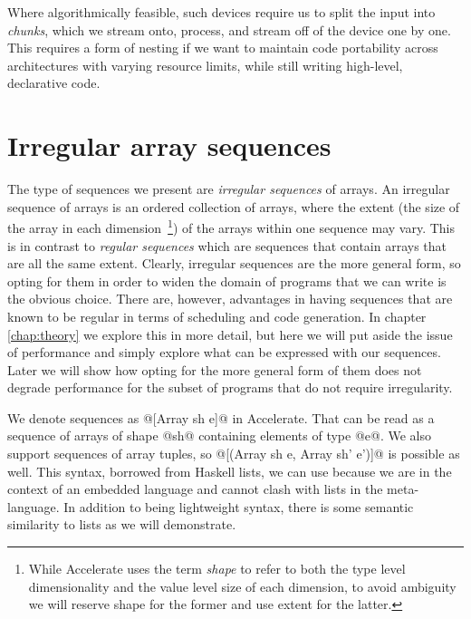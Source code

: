 Where algorithmically feasible, such devices require us to split the input into \emph{chunks}, which we stream onto, process, and stream off of the device one by one. This requires a form of nesting if we want to maintain code portability across architectures with varying resource limits, while still writing high-level, declarative code.

\section{Irregular array sequences}
\label{sec:sequences}

The type of sequences we present are \emph{irregular sequences} of arrays. An irregular sequence of arrays is an ordered collection of arrays, where the extent (the size of the array in each dimension~\footnote{While Accelerate uses the term \emph{shape} to refer to both the type level dimensionality and the value level size of each dimension, to avoid ambiguity we will reserve shape for the former and use extent for the latter.}) of the arrays within one sequence may vary. This is in contrast to \emph{regular sequences} which are sequences that contain arrays that are all the same extent. Clearly, irregular sequences are the more general form, so opting for them in order to widen the domain of programs that we can write is the obvious choice. There are, however, advantages in having sequences that are known to be regular in terms of scheduling and code generation. In chapter \ref{chap:theory} we explore this in more detail, but here we will put aside the issue of performance and simply explore what can be expressed with our sequences. Later we will show how opting for the more general form of them does not degrade performance for the subset of programs that do not require irregularity.

We denote sequences as @[Array sh e]@ in Accelerate. That can be read as a sequence of arrays of shape @sh@ containing elements of type @e@. We also support sequences of array tuples, so @[(Array sh e, Array sh' e')]@ is possible as well. This syntax, borrowed from Haskell lists, we can use because we are in the context of an embedded language and cannot clash with lists in the meta-language. In addition to being lightweight syntax, there is some semantic similarity to lists as we will demonstrate.


